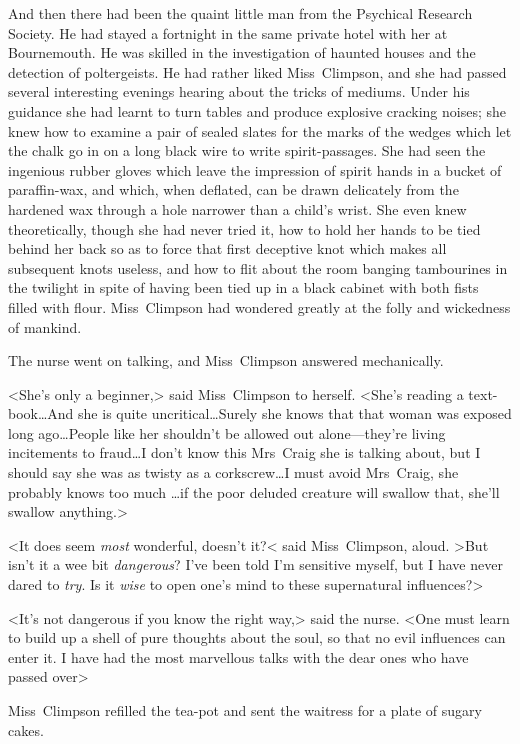 And then there had been the quaint little man from the Psychical Research Society. He had stayed a fortnight in the same private hotel with her at Bournemouth. He was skilled in the investigation of haunted houses and the detection of poltergeists. He had rather liked Miss~Climpson, and she had passed several interesting evenings hearing about the tricks of mediums. Under his guidance she had learnt to turn tables and produce explosive cracking noises; she knew how to examine a pair of sealed slates for the marks of the wedges which let the chalk go in on a long black wire to write spirit-passages. She had seen the ingenious rubber gloves which leave the impression of spirit hands in a bucket of paraffin-wax, and which, when deflated, can be drawn delicately from the hardened wax through a hole narrower than a child's wrist. She even knew theoretically, though she had never tried it, how to hold her hands to be tied behind her back so as to force that first deceptive knot which makes all subsequent knots useless, and how to flit about the room banging tambourines in the twilight in spite of having been tied up in a black cabinet with both fists filled with flour. Miss~Climpson had wondered greatly at the folly and wickedness of mankind.

The nurse went on talking, and Miss~Climpson answered mechanically.

<She's only a beginner,> said Miss~Climpson to herself. <She's reading a text-book\dots And she is quite uncritical\dots Surely she knows that that woman was exposed long ago\dots People like her shouldn't be allowed out alone—they're living incitements to fraud\dots I don't know this Mrs~Craig she is talking about, but I should say she was as twisty as a corkscrew\dots I must avoid Mrs~Craig, she probably knows too much \dots if the poor deluded creature will swallow that, she'll swallow anything.>

<It does seem \emph{most} wonderful, doesn't it?< said Miss~Climpson, aloud. >But isn't it a wee bit \emph{dangerous}? I've been told I'm sensitive myself, but I have never dared to \emph{try}. Is it \emph{wise} to open one's mind to these supernatural influences?>

<It's not dangerous if you know the right way,> said the nurse. <One must learn to build up a shell of pure thoughts about the soul, so that no evil influences can enter it. I have had the most marvellous talks with the dear ones who have passed over\longdots>

Miss~Climpson refilled the tea-pot and sent the waitress for a plate of sugary cakes.

